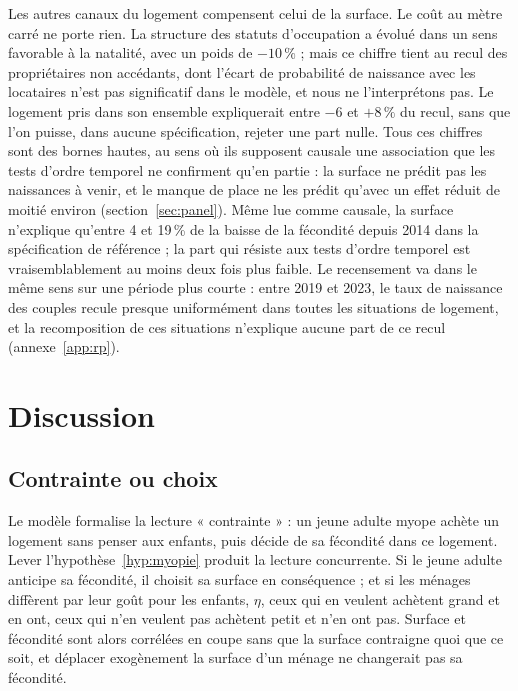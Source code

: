 \documentclass[11pt,a4paper]{article}
\theoremstyle{plain}
\theoremstyle{definition}
\theoremstyle{remark}
\begin{document}
Les autres canaux du logement compensent celui de la surface. Le coût au mètre carré ne porte rien. La structure des statuts d'occupation a évolué dans un sens favorable à la natalité, avec un poids de $-10\,\%$ ; mais ce chiffre tient au recul des propriétaires non accédants, dont l'écart de probabilité de naissance avec les locataires n'est pas significatif dans le modèle, et nous ne l'interprétons pas. Le logement pris dans son ensemble expliquerait entre $-6$ et $+8\,\%$ du recul, sans que l'on puisse, dans aucune spécification, rejeter une part nulle. Tous ces chiffres sont des bornes hautes, au sens où ils supposent causale une association que les tests d'ordre temporel ne confirment qu'en partie : la surface ne prédit pas les naissances à venir, et le manque de place ne les prédit qu'avec un effet réduit de moitié environ (section~\ref{sec:panel}). Même lue comme causale, la surface n'explique qu'entre 4 et 19\,\% de la baisse de la fécondité depuis 2014 dans la spécification de référence ; la part qui résiste aux tests d'ordre temporel est vraisemblablement au moins deux fois plus faible. Le recensement va dans le même sens sur une période plus courte : entre 2019 et 2023, le taux de naissance des couples recule presque uniformément dans toutes les situations de logement, et la recomposition de ces situations n'explique aucune part de ce recul (annexe~\ref{app:rp}).

\section{Discussion}\label{sec:discussion}

\subsection{Contrainte ou choix}

Le modèle formalise la lecture « contrainte » : un jeune adulte myope achète un logement sans penser aux enfants, puis décide de sa fécondité dans ce logement. Lever l'hypothèse~\ref{hyp:myopie} produit la lecture concurrente. Si le jeune adulte anticipe sa fécondité, il choisit sa surface en conséquence ; et si les ménages diffèrent par leur goût pour les enfants, $\eta$, ceux qui en veulent achètent grand et en ont, ceux qui n'en veulent pas achètent petit et n'en ont pas. Surface et fécondité sont alors corrélées en coupe sans que la surface contraigne quoi que ce soit, et déplacer exogènement la surface d'un ménage ne changerait pas sa fécondité.
\end{document}
